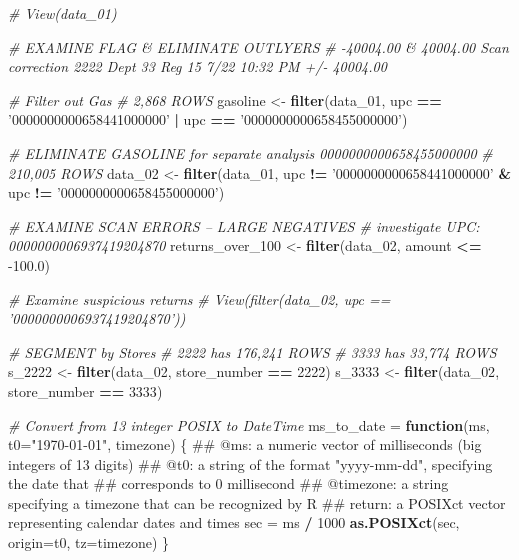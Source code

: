 \documentclass[]{article}
\newenvironment{Shaded}{\begin{snugshade}}{\end{snugshade}}
\newcommand{\KeywordTok}[1]{\textcolor[rgb]{0.13,0.29,0.53}{\textbf{#1}}}
\newcommand{\DataTypeTok}[1]{\textcolor[rgb]{0.13,0.29,0.53}{#1}}
\newcommand{\DecValTok}[1]{\textcolor[rgb]{0.00,0.00,0.81}{#1}}
\newcommand{\FloatTok}[1]{\textcolor[rgb]{0.00,0.00,0.81}{#1}}
\newcommand{\StringTok}[1]{\textcolor[rgb]{0.31,0.60,0.02}{#1}}
\newcommand{\CommentTok}[1]{\textcolor[rgb]{0.56,0.35,0.01}{\textit{#1}}}
\newcommand{\ControlFlowTok}[1]{\textcolor[rgb]{0.13,0.29,0.53}{\textbf{#1}}}
\newcommand{\OperatorTok}[1]{\textcolor[rgb]{0.81,0.36,0.00}{\textbf{#1}}}
\newcommand{\NormalTok}[1]{#1}
\begin{document}
\begin{Shaded}
\begin{Highlighting}[]
\CommentTok{# View(data_01)}

\CommentTok{# EXAMINE FLAG & ELIMINATE OUTLYERS}
\CommentTok{# -40004.00 & 40004.00 Scan correction 2222 Dept 33 Reg 15 7/22 10:32 PM +/- 40004.00}

\CommentTok{# Filter out Gas}
\CommentTok{# 2,868 ROWS}
\NormalTok{gasoline <-}\StringTok{ }\KeywordTok{filter}\NormalTok{(data_}\DecValTok{01}\NormalTok{, upc }\OperatorTok{==}\StringTok{ '0000000000658441000000'} \OperatorTok{|}\StringTok{ }\NormalTok{upc }\OperatorTok{==}\StringTok{ '0000000000658455000000'}\NormalTok{)}

\CommentTok{# ELIMINATE GASOLINE for separate analysis 0000000000658455000000}
\CommentTok{# 210,005 ROWS}
\NormalTok{data_}\DecValTok{02}\NormalTok{ <-}\StringTok{ }\KeywordTok{filter}\NormalTok{(data_}\DecValTok{01}\NormalTok{, upc }\OperatorTok{!=}\StringTok{ '0000000000658441000000'} \OperatorTok{&}\StringTok{ }\NormalTok{upc }\OperatorTok{!=}\StringTok{ '0000000000658455000000'}\NormalTok{)}

\CommentTok{# EXAMINE SCAN ERRORS -- LARGE NEGATIVES  # investigate UPC: 0000000006937419204870}
\NormalTok{returns_over_}\DecValTok{100}\NormalTok{ <-}\StringTok{ }\KeywordTok{filter}\NormalTok{(data_}\DecValTok{02}\NormalTok{, amount }\OperatorTok{<=}\StringTok{ }\FloatTok{-100.0}\NormalTok{)}

\CommentTok{# Examine suspicious returns}
\CommentTok{# View(filter(data_02, upc == '0000000006937419204870'))}

\CommentTok{# SEGMENT by Stores}
\CommentTok{# 2222 has 176,241 ROWS}
\CommentTok{# 3333 has 33,774 ROWS}
\NormalTok{s_}\DecValTok{2222}\NormalTok{ <-}\StringTok{ }\KeywordTok{filter}\NormalTok{(data_}\DecValTok{02}\NormalTok{, store_number }\OperatorTok{==}\StringTok{ }\DecValTok{2222}\NormalTok{)}
\NormalTok{s_}\DecValTok{3333}\NormalTok{ <-}\StringTok{ }\KeywordTok{filter}\NormalTok{(data_}\DecValTok{02}\NormalTok{, store_number }\OperatorTok{==}\StringTok{ }\DecValTok{3333}\NormalTok{)}

\CommentTok{# Convert from 13 integer POSIX to DateTime}
\NormalTok{ms_to_date =}\StringTok{ }\ControlFlowTok{function}\NormalTok{(ms, }\DataTypeTok{t0=}\StringTok{"1970-01-01"}\NormalTok{, timezone) \{}
\NormalTok{  ## @ms: a numeric vector of milliseconds (big integers of 13 digits)}
\NormalTok{  ## @t0: a string of the format "yyyy-mm-dd", specifying the date that}
\NormalTok{  ##      corresponds to 0 millisecond}
\NormalTok{  ## @timezone: a string specifying a timezone that can be recognized by R}
\NormalTok{  ## return: a POSIXct vector representing calendar dates and times        }
\NormalTok{  sec =}\StringTok{ }\NormalTok{ms }\OperatorTok{/}\StringTok{ }\DecValTok{1000}
  \KeywordTok{as.POSIXct}\NormalTok{(sec, }\DataTypeTok{origin=}\NormalTok{t0, }\DataTypeTok{tz=}\NormalTok{timezone)}
\NormalTok{\}}


\end{Highlighting}
\end{Shaded}
\end{document}

